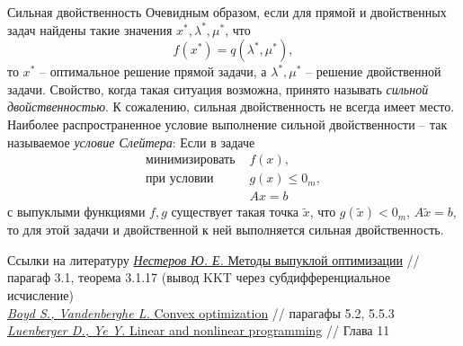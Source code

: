 \documentclass[10pt]{beamer}
\begin{document}
\begin{frame}{Сильная двойственность}
Очевидным образом, если для прямой и двойственных задач найдены такие значения $x^*, \lambda^*, \mu^*$, что
$$
f(x^*)=q(\lambda^*, \mu^*),
$$
то $x^*$ -- оптимальное решение прямой задачи, а $\lambda^*, \mu^*$ -- решение двойственной задачи. Свойство, когда такая ситуация возможна, принято называть \textit{сильной двойственностью}. К сожалению, сильная двойственность не всегда имеет место. Наиболее распространенное условие выполнение сильной двойственности -- так называемое \textit{условие Слейтера}: Если в задаче
$$
\begin{array}{ll}
\mbox{минимизировать } & f(x),\\
\mbox{при условии }    & g(x)\leq 0_m,\\
	& Ax=b
\end{array}
$$
с выпуклыми функциями $f,g$ существует такая точка $\tilde{x}$, что $g(\tilde{x})<0_m$, $A\tilde{x}=b$, то для этой задачи и двойственной к ней выполняется сильная двойственность.

\end{frame}

\begin{frame}{Ссылки на литературу}
\href{http://premolab.ru/pub_files/pub5/MnexoB89z7.pdf}{\textit{Нестеров Ю. Е.} 
Методы выпуклой оптимизации} // парагаф 3.1, теорема 3.1.17 (вывод KKT через субдифференциальное исчисление) \\
\vspace{1em}
\href{https://web.stanford.edu/~boyd/cvxbook/bv_cvxbook.pdf}{\textit{Boyd S., Vandenberghe L.} 
Convex optimization} // парагафы 5.2, 5.5.3 \\
\vspace{1em}
\href{https://web.stanford.edu/class/msande310/310trialtext.pdf}{\textit{Luenberger D., Ye Y.} 
Linear and nonlinear programming} // Глава 11 \\
\end{frame}
\end{document}
